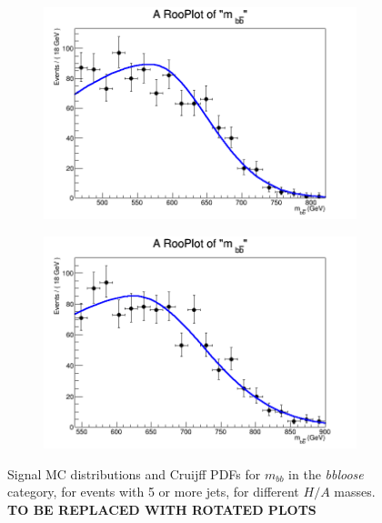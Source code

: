 \begin{figure}[phtb!]
\begin{center}
  \begin{subfigure}[$m_{A}=700$ GeV]{0.4\textwidth}\includegraphics[width=\textwidth]{FitResults/images/fitMC_bAbb700_6.png}\end{subfigure}
  \begin{subfigure}[$m_{A}=800$ GeV]{0.4\textwidth}\includegraphics[width=\textwidth]{FitResults/images/fitMC_bAbb800_6.png}\end{subfigure}
  \caption{Signal MC distributions and Cruijff PDFs for $m_{bb}$ in the {\it bbloose} category, for events with 5 or more jets, for different $H/A$ masses. 
\textbf{TO BE REPLACED WITH ROTATED PLOTS} \label{fig:signalPDFs_5j_bbloose}}
    \end{center}
\end{figure}


